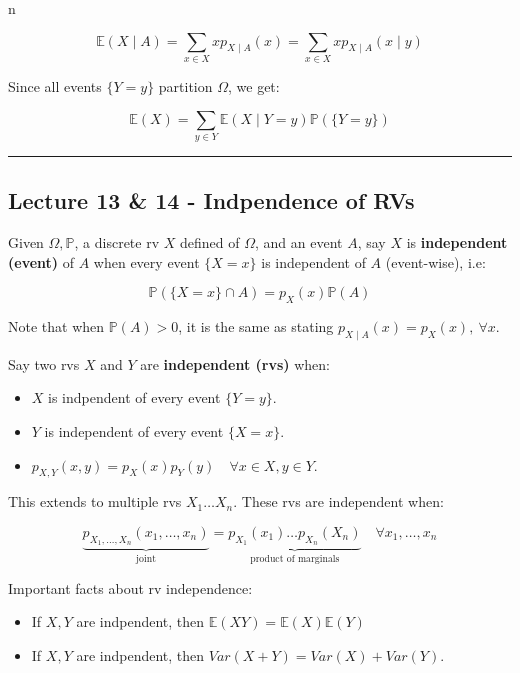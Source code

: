 n\documentclass{article}
\begin{document}
\[
  \mathbb{E}(X\mid A) = \sum_{x\in X} xp_{X\mid A}(x) = \sum_{x\in X}
  xp_{X\mid A}(x \mid y)
\]

Since all events $\{Y = y\}$ partition $\Omega$, we get:

\[
  \mathbb{E}(X) = \sum_{y\in Y} \mathbb{E}(X \mid Y=y)
  \mathbb{P}(\{Y=y\})
\]


\medskip\hrule
\subsection{Lecture 13 \& 14 - Indpendence of RVs}

Given $\Omega, \mathbb{P}$, a discrete rv $X$ defined of $\Omega$, and
an event $A$, say $X$ is \textbf{independent (event)} of $A$ when
every event $\{X=x\}$ is independent of $A$ (event-wise), i.e:

\begin{equation}
  \tag{RV Event Independence}
  \boxed{
    \mathbb{P}(\{X=x\} \cap A) = p_X(x) \mathbb{P}(A)
  }
\end{equation}

Note that when $\mathbb{P}(A) > 0$, it is the same as stating
$p_{X\mid A} (x) = p_X(x),\ \forall x$.

Say two rvs $X$ and $Y$ are \textbf{independent (rvs)} when:

\begin{itemize}
\item $X$ is indpendent of every event $\{Y=y\}$.
\item $Y$ is independent of every event $\{X=x\}$.
\item $p_{X,Y}(x,y) = p_X(x) p_Y(y) \quad \forall x\in X, y\in Y$.
\end{itemize}

This extends to multiple rvs $X_1\dots X_n$. These rvs are independent
when:

\[
  \underbrace{p_{X_1,\dots,X_n}(x_1,\dots,x_n)}_{\text{joint}} =
  \underbrace{p_{X_1}(x_1)\dots p_{X_n}(X_n)}_{\text{product of
      marginals}} \quad \forall x_1, \dots, x_n
\]

Important facts about rv independence:

\begin{itemize}
\item If $X, Y$ are indpendent, then $\mathbb{E}(XY) = \mathbb{E}(X)
  \mathbb{E}(Y)$
  
\item If $X, Y$ are indpendent, then $Var(X+Y) = Var(X) + Var(Y)$.  
\end{itemize}
\end{document}
